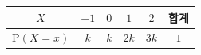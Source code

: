 {\setlength{\tabcolsep}{7pt}\renewcommand{\arraystretch}{1.35}%
\begin{tabular}{|c|c|c|c|c|c|}
\hline
$X$ & $-1$ & $0$ & $1$ & $2$ & \textbf{합계} \\
\hline
$\mathrm{P}(X=x)$ & $k$ & $k$ & $2k$ & $3k$ & $1$ \\
\hline
\end{tabular}}
